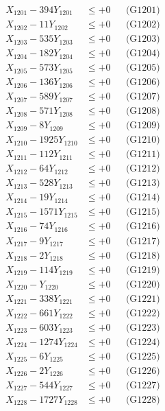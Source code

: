 \documentclass[a4paper,10pt]{article}
\begin{document}
{\begin{align}
\allowbreak
X_{1201} - 394Y_{1201} &\leq +0 && \text{(G1201)} \\
X_{1202} - 11Y_{1202} &\leq +0 && \text{(G1202)} \\
X_{1203} - 535Y_{1203} &\leq +0 && \text{(G1203)} \\
X_{1204} - 182Y_{1204} &\leq +0 && \text{(G1204)} \\
X_{1205} - 573Y_{1205} &\leq +0 && \text{(G1205)} \\
X_{1206} - 136Y_{1206} &\leq +0 && \text{(G1206)} \\
X_{1207} - 589Y_{1207} &\leq +0 && \text{(G1207)} \\
X_{1208} - 571Y_{1208} &\leq +0 && \text{(G1208)} \\
X_{1209} - 8Y_{1209} &\leq +0 && \text{(G1209)} \\
X_{1210} - 1925Y_{1210} &\leq +0 && \text{(G1210)} \\
\allowbreak
X_{1211} - 112Y_{1211} &\leq +0 && \text{(G1211)} \\
X_{1212} - 64Y_{1212} &\leq +0 && \text{(G1212)} \\
X_{1213} - 528Y_{1213} &\leq +0 && \text{(G1213)} \\
X_{1214} - 19Y_{1214} &\leq +0 && \text{(G1214)} \\
X_{1215} - 1571Y_{1215} &\leq +0 && \text{(G1215)} \\
X_{1216} - 74Y_{1216} &\leq +0 && \text{(G1216)} \\
X_{1217} - 9Y_{1217} &\leq +0 && \text{(G1217)} \\
X_{1218} - 2Y_{1218} &\leq +0 && \text{(G1218)} \\
X_{1219} - 114Y_{1219} &\leq +0 && \text{(G1219)} \\
X_{1220} - Y_{1220} &\leq +0 && \text{(G1220)} \\
\allowbreak
X_{1221} - 338Y_{1221} &\leq +0 && \text{(G1221)} \\
X_{1222} - 661Y_{1222} &\leq +0 && \text{(G1222)} \\
X_{1223} - 603Y_{1223} &\leq +0 && \text{(G1223)} \\
X_{1224} - 1274Y_{1224} &\leq +0 && \text{(G1224)} \\
X_{1225} - 6Y_{1225} &\leq +0 && \text{(G1225)} \\
X_{1226} - 2Y_{1226} &\leq +0 && \text{(G1226)} \\
X_{1227} - 544Y_{1227} &\leq +0 && \text{(G1227)} \\
X_{1228} - 1727Y_{1228} &\leq +0 && \text{(G1228)} \\

\end{align}}
\end{document}
